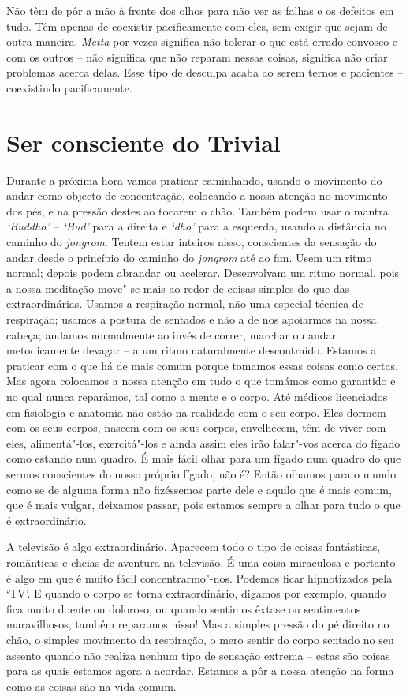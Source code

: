 Não têm de pôr a mão à frente dos olhos para não ver as falhas e os
defeitos em tudo. Têm apenas de coexistir pacificamente com eles, sem
exigir que sejam de outra maneira. \emph{Mettā} por vezes significa não
tolerar o que está errado convosco e com os outros -- não significa que
não reparam nessas coisas, significa não criar problemas acerca delas.
Esse tipo de desculpa acaba ao serem ternos e pacientes -- coexistindo
pacificamente.

\chapter{Ser consciente do Trivial}

Durante a próxima hora vamos praticar caminhando, usando o movimento do
andar como objecto de concentração, colocando a nossa atenção no
movimento dos pés, e na pressão destes ao tocarem o chão. Também podem
usar o mantra \emph{`Buddho' -- `Bud'} para a direita e \emph{`dho'}
para a esquerda, usando a distância no caminho do \emph{jongrom}. Tentem
estar inteiros nisso, conscientes da sensação do andar desde o princípio
do caminho do \emph{jongrom} até ao fim. Usem um ritmo normal; depois
podem abrandar ou acelerar. Desenvolvam um ritmo normal, pois a nossa
meditação move"-se mais ao redor de coisas simples do que das
extraordinárias. Usamos a respiração normal, não uma especial técnica de
respiração; usamos a postura de sentados e não a de nos apoiarmos na
nossa cabeça; andamos normalmente ao invés de correr, marchar ou andar
metodicamente devagar -- a um ritmo naturalmente descontraído. Estamos a
praticar com o que há de mais comum porque tomamos essas coisas como
certas. Mas agora colocamos a nossa atenção em tudo o que tomámos como
garantido e no qual nunca reparámos, tal como a mente e o corpo. Até
médicos licenciados em fisiologia e anatomia não estão na realidade com
o seu corpo. Eles dormem com os seus corpos, nascem com os seus corpos,
envelhecem, têm de viver com eles, alimentá"-los, exercitá"-los e ainda
assim eles irão falar"-vos acerca do fígado como estando num quadro. É
mais fácil olhar para um fígado num quadro do que sermos conscientes do
nosso próprio fígado, não é? Então olhamos para o mundo como se de
alguma forma não fizéssemos parte dele e aquilo que é
mais comum, que é mais vulgar, deixamos passar, pois estamos sempre a
olhar para tudo o que é extraordinário.

A televisão é algo extraordinário. Aparecem todo o tipo de coisas
fantásticas, românticas e cheias de aventura na televisão. É uma coisa
miraculosa e portanto é algo em que é muito fácil concentrarmo"-nos.
Podemos ficar hipnotizados pela `TV'. E quando o corpo se torna
extraordinário, digamos por exemplo, quando fica muito doente ou
doloroso, ou quando sentimos êxtase ou sentimentos maravilhosos, também
reparamos nisso! Mas a simples pressão do pé direito no chão, o simples
movimento da respiração, o mero sentir do corpo sentado no seu assento
quando não realiza nenhum tipo de sensação extrema -- estas são coisas
para as quais estamos agora a acordar. Estamos a pôr a nossa atenção na
forma como as coisas são na vida comum.

